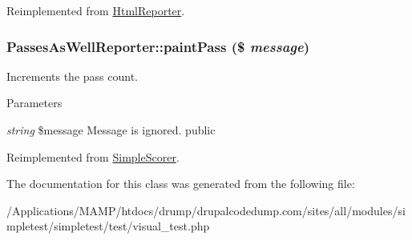 Reimplemented from \hyperlink{class_html_reporter_ad07ccfd2972eaa99fb57055f430ec498}{HtmlReporter}.\hypertarget{class_passes_as_well_reporter_a5dd3369d83cca3dded4900b1cb209f51}{
\subsubsection[{paintPass}]{\setlength{\rightskip}{0pt plus 5cm}PassesAsWellReporter::paintPass (\$ {\em message})}}
\label{class_passes_as_well_reporter_a5dd3369d83cca3dded4900b1cb209f51}
Increments the pass count. 
\begin{DoxyParams}{Parameters}
\item[{\em string}]\$message Message is ignored.  public \end{DoxyParams}


Reimplemented from \hyperlink{class_simple_scorer_a02d68e8d94800e50603413d1913c25d0}{SimpleScorer}.

The documentation for this class was generated from the following file:\begin{DoxyCompactItemize}
\item 
/Applications/MAMP/htdocs/drump/drupalcodedump.com/sites/all/modules/simpletest/simpletest/test/visual\_\-test.php\end{DoxyCompactItemize}
